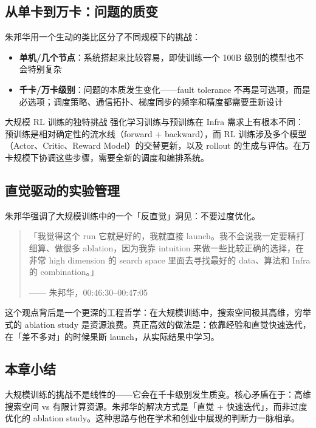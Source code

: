 \documentclass[a4paper]{article}
\begin{document}
\subsection{从单卡到万卡：问题的质变}

朱邦华用一个生动的类比区分了不同规模下的挑战：

\begin{itemize}
\item \textbf{单机/几个节点}：系统搭起来比较容易，即使训练一个 100B 级别的模型也不会特别复杂
\item \textbf{千卡/万卡级别}：问题的本质发生变化——fault tolerance 不再是可选项，而是必选项；调度策略、通信拓扑、梯度同步的频率和精度都需要重新设计
\end{itemize}

\begin{importantbox}{大规模 RL 训练的独特挑战}
强化学习训练与预训练在 Infra 需求上有根本不同：预训练是相对确定性的流水线（forward + backward），而 RL 训练涉及多个模型（Actor、Critic、Reward Model）的交替更新，以及 rollout 的生成与评估。在万卡规模下协调这些步骤，需要全新的调度和编排系统。
\end{importantbox}

\subsection{直觉驱动的实验管理}

朱邦华强调了大规模训练中的一个「反直觉」洞见：不要过度优化。

\begin{quote}
「我觉得这个 run 它就是好的，我就直接 launch。我不会说我一定要精打细算、做很多 ablation，因为我靠 intuition 来做一些比较正确的选择，在非常 high dimension 的 search space 里面去寻找最好的 data、算法和 Infra 的 combination。」\par
\hfill —— 朱邦华，00:46:30--00:47:05
\end{quote}

这个观点背后是一个更深的工程哲学：在大规模训练中，搜索空间极其高维，穷举式的 ablation study 是资源浪费。真正高效的做法是：依靠经验和直觉快速迭代，在「差不多对」的时候果断 launch，从实际结果中学习。

\subsection{本章小结}
大规模训练的挑战不是线性的——它会在千卡级别发生质变。核心矛盾在于：高维搜索空间 vs 有限计算资源。朱邦华的解决方式是「直觉 + 快速迭代」，而非过度优化的 ablation study。这种思路与他在学术和创业中展现的判断力一脉相承。
\end{document}
